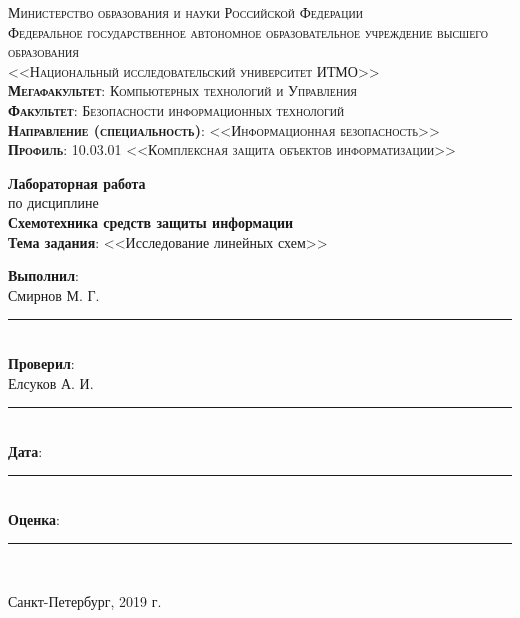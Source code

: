 \begin{titlepage}
	\begin{center}
		\textsc{
			\fontsize{12pt}{14pt}\selectfont
			Министерство образования и науки Российской Федерации\\
Федеральное государственное автономное образовательное учреждение высшего образования\\
<<Национальный исследовательский университет ИТМО>>\\
	\textbf{Мегафакультет}:  Компьютерных технологий и Управления\\
			\textbf{Факультет}: Безопасности информационных технологий\\
			\textbf{Направление (специальность)}: <<Информационная безопасность>>\\
			\textbf{Профиль}: 10.03.01 <<Комплексная защита объектов информатизации>>}
		
		\vfill
		
		\textbf{Лабораторная работа}\\
		по дисциплине\\
		\textbf{Схемотехника средств защиты информации}\\
	\vfill
	\textbf{Тема задания}: <<Исследование линейных схем>>\\
	\end{center}

	\vfill
	
	\begin{flushright}
	\textbf{Выполнил}:\\ Смирнов М. Г. \rule{5em}{.1pt}\\
	\textbf{Проверил}:\\ Елсуков А. И.\rule{5em}{.1pt}\\
		\vfill
	\textbf{Дата}: \rule{10em}{.1pt}\\
	\textbf{Оценка}: \rule{10em}{.1pt}\\

	\vfill
	


	\end{flushright}
	\vfill
	\begin{center}
		Санкт-Петербург, 2019 г.
	\end{center}
\end{titlepage}